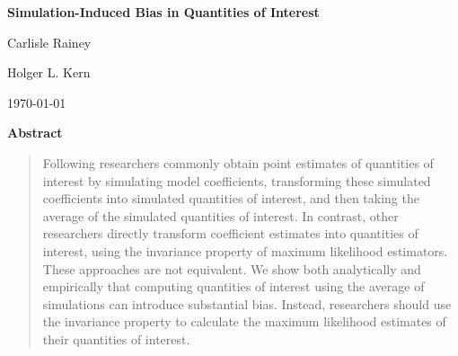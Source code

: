 \documentclass[11pt]{article}
\begin{document}
\begin{center}

{\Large \textbf{Simulation-Induced Bias in Quantities of Interest}}

\vspace{1cm}

Carlisle Rainey

\vspace{5mm}

Holger L. Kern

\vspace{1cm}

\today
\end{center}

\vspace{5mm}

{\centerline{\textbf{Abstract}}}
\begin{quote}\noindent
Following \cite{KingTomzWittenberg2000} researchers commonly obtain point estimates of quantities of interest by simulating model coefficients, transforming these simulated coefficients into simulated quantities of interest, and then taking the average of the simulated quantities of interest.
In contrast, other researchers directly transform coefficient estimates into quantities of interest, using the invariance property of maximum likelihood estimators.
These approaches are not equivalent.
We show both analytically and empirically that computing quantities of interest using the average of simulations can introduce substantial bias.
Instead, researchers should use the invariance property to calculate the maximum likelihood estimates of their quantities of interest.
\\
\end{quote}
\end{document}
